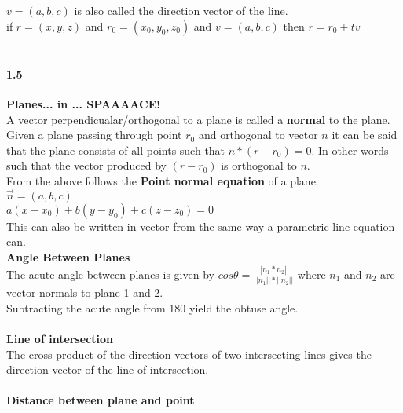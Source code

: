 \documentclass[14pt]{extreport}
\begin{document}
$v = (a, b, c)$ is also called the direction vector of the line.\\

if $r = (x, y, z)$ and $r_0 = (x_0, y_0, z_0)$ and $v = (a, b, c)$ then
	$r = r_0 + tv$\\\\


\paragraph{1.5}\textbf{Planes... in ... SPAAAACE!}\\

A vector perpendicualar/orthogonal to a plane is called a \textbf{normal} to the plane.\\

Given a plane passing through point $r_0$ and orthogonal to vector $n$ it can be said that the plane consists of all points such that $n * (r - r_0) = 0$. In other words such that the vector produced by $(r - r_0)$ is orthogonal to $n$.\\

From the above follows the \textbf{Point normal equation} of a plane.\\
$\vec{n} = (a, b, c)$\\
$a(x - x_0) + b(y - y_0) + c(z - z_0) = 0$\\

This can also be written in vector from the same way a parametric line equation can.\\

\textbf{Angle Between Planes}\\

The acute angle between planes is given by $cos \theta = \frac{|n_1 * n_2|}{||n_1||*||n_2||}$ where $n_1$ and $n_2$ are vector normals to plane 1 and 2.\\

Subtracting the acute angle from 180 yield the obtuse angle.\\\\

\textbf{Line of intersection}\\

The cross product of the direction vectors of two intersecting lines gives the direction vector of the line of intersection.\\\\

\textbf{Distance between plane and point}\\
\end{document}
